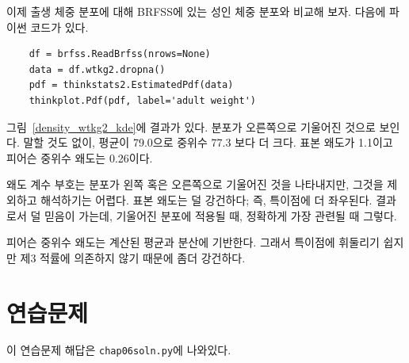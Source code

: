 이제 출생 체중 분포에 대해 BRFSS에 있는 성인 체중 분포와 비교해 보자.
다음에 파이썬 코드가 있다.

\begin{verbatim}
    df = brfss.ReadBrfss(nrows=None)
    data = df.wtkg2.dropna()
    pdf = thinkstats2.EstimatedPdf(data)
    thinkplot.Pdf(pdf, label='adult weight')
\end{verbatim}

그림~\ref{density_wtkg2_kde}에 결과가 있다.
분포가 오른쪽으로 기울어진 것으로 보인다.
말할 것도 없이, 평균이 79.0으로 중위수 77.3 보다 더 크다.
표본 왜도가 1.1이고 피어슨 중위수 왜도는 0.26이다.

왜도 계수 부호는 분포가 왼쪽 혹은 오른쪽으로 기울어진 것을 나타내지만,
그것을 제외하고 해석하기는 어렵다.
표본 왜도는 덜 강건하다; 즉, 특이점에 더 좌우된다.
결과로서 덜 믿음이 가는데, 기울어진 분포에 적용될 때, 정확하게 가장 관련될 때 그렇다. 


피어슨 중위수 왜도는 계산된 평균과 분산에 기반한다.
그래서 특이점에 휘둘리기 쉽지만 제3 적률에 의존하지 않기 때문에 좀더 강건하다.


\section{연습문제}

이 연습문제 해답은 \verb"chap06soln.py"에 나와있다.

